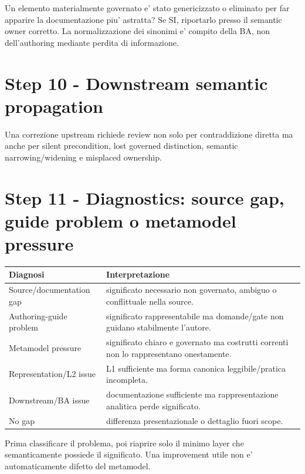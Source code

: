 \documentclass[11pt,a4paper]{article}
\begin{document}
\begin{ddtacheck}[title={Information-preservation check}]
Un elemento materialmente governato e' stato genericizzato o eliminato per far apparire la documentazione piu' astratta? Se SI, riportarlo presso il semantic owner corretto. La normalizzazione dei sinonimi e' compito della BA, non dell'authoring mediante perdita di informazione.
\end{ddtacheck}

\section{Step 10 - Downstream semantic propagation}
\closedtag

Una correzione upstream richiede review non solo per contraddizione diretta ma anche per silent precondition, lost governed distinction, semantic narrowing/widening e misplaced ownership.

\section{Step 11 - Diagnostics: source gap, guide problem o metamodel pressure}
\holdouttag

\begin{longtable}{L{47mm}L{93mm}}
\toprule
\textbf{Diagnosi} & \textbf{Interpretazione} \\
\midrule\endhead
Source/documentation gap & significato necessario non governato, ambiguo o conflittuale nella source. \\
Authoring-guide problem & significato rappresentabile ma domande/gate non guidano stabilmente l'autore. \\
Metamodel pressure & significato chiaro e governato ma costrutti correnti non lo rappresentano onestamente. \\
Representation/L2 issue & L1 sufficiente ma forma canonica leggibile/pratica incompleta. \\
Downstream/BA issue & documentazione sufficiente ma rappresentazione analitica perde significato. \\
No gap & differenza presentazionale o dettaglio fuori scope. \\
\bottomrule
\end{longtable}

\begin{ddtacore}[title={Minimum owning layer}]
Prima classificare il problema, poi riaprire solo il minimo layer che semanticamente possiede il significato. Una improvement utile non e' automaticamente difetto del metamodel.
\end{ddtacore}
\end{document}
